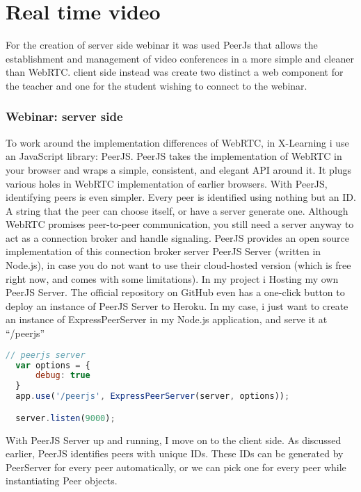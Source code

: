 \newpage
\section{Real time video}
\label{sec:RealTimeVideo}

For the creation of server side webinar it was used PeerJs that allows the establishment and management of video conferences in a more simple and
cleaner than WebRTC. client side instead was create two distinct a web component for the teacher and one for the student wishing to
connect to the webinar.

\subsubsection{Webinar: server side}
To work around the implementation differences of WebRTC, in X-Learning i use an JavaScript library: PeerJS.
PeerJS takes the implementation of WebRTC in your browser and wraps a simple, consistent, and elegant API around it. It plugs various holes in WebRTC implementation of earlier browsers. 
With PeerJS, identifying peers is even simpler. Every peer is identified using nothing but an ID. A string that the peer can choose itself, or have a server generate one. Although WebRTC promises peer-to-peer communication, you still need a server anyway to act as a connection broker and handle signaling. PeerJS provides an open source implementation of this connection broker server PeerJS Server (written in Node.js), in case you do not want to use their cloud-hosted version (which is free right now, and comes with some limitations).
In my project i Hosting my own PeerJS Server. The official repository on GitHub even has a one-click button to deploy an instance of PeerJS Server to Heroku.
In my case, i just want to create an instance of ExpressPeerServer in my Node.js application, and serve it at “/peerjs”

\begin{lstlisting}[language=javascript]
// peerjs server
  var options = {
      debug: true
  }
  app.use('/peerjs', ExpressPeerServer(server, options));

  server.listen(9000);
\end{lstlisting}


With PeerJS Server up and running, I move on to the client side. As discussed earlier, PeerJS identifies peers with unique IDs. These IDs can be generated by PeerServer for every peer automatically, or we can pick one for every peer while instantiating Peer objects.

